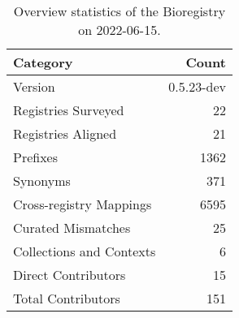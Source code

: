 \begin{table}
\centering
\caption{Overview statistics of the Bioregistry on 2022-06-15.}
\label{tab:bioregistry-summary}
\begin{tabular}{lr}
\toprule
                Category &      Count \\
\midrule
                 Version & 0.5.23-dev \\
     Registries Surveyed &         22 \\
      Registries Aligned &         21 \\
                Prefixes &       1362 \\
                Synonyms &        371 \\
 Cross-registry Mappings &       6595 \\
      Curated Mismatches &         25 \\
Collections and Contexts &          6 \\
     Direct Contributors &         15 \\
      Total Contributors &        151 \\
\bottomrule
\end{tabular}
\end{table}
